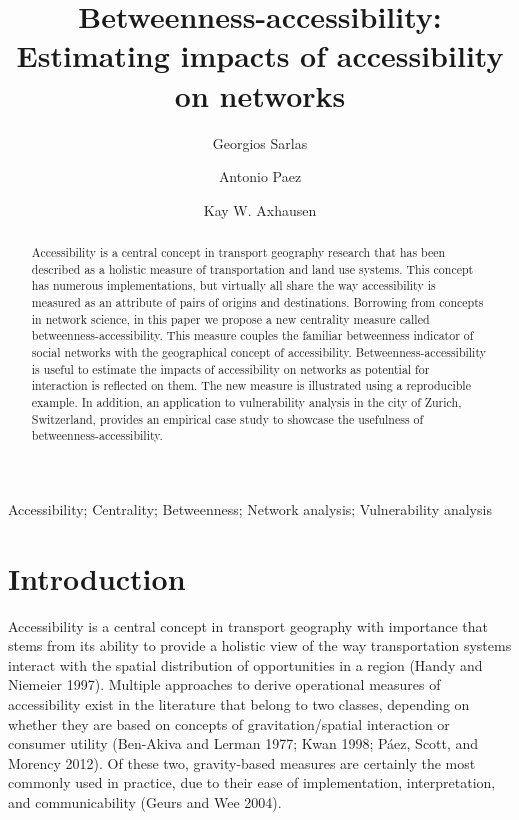 \documentclass[]{elsarticle} %
\begin{document}
\begin{frontmatter}

  \title{Betweenness-accessibility: Estimating impacts of accessibility on
networks}
    \author[ETH]{Georgios Sarlas}
    \author[McMaster University]{Antonio Paez}
  
    \author[ETH]{Kay W. Axhausen}
  
      \address[ETH]{ETH Zurich, Institute for Transport Planning and Systems,
Stefano-Franscini-Platz 5, 8093 Zurich, Switzerland}
    \address[McMaster University]{McMaster University, School of Geography and Earth Sciences, 1280 Main
St W, Hamilton, Ontario, L8S 1S4 Canada}
  
  \begin{abstract}
  Accessibility is a central concept in transport geography research that
  has been described as a holistic measure of transportation and land use
  systems. This concept has numerous implementations, but virtually all
  share the way accessibility is measured as an attribute of pairs of
  origins and destinations. Borrowing from concepts in network science, in
  this paper we propose a new centrality measure called
  betweenness-accessibility. This measure couples the familiar betweenness
  indicator of social networks with the geographical concept of
  accessibility. Betweenness-accessibility is useful to estimate the
  impacts of accessibility on networks as potential for interaction is
  reflected on them. The new measure is illustrated using a reproducible
  example. In addition, an application to vulnerability analysis in the
  city of Zurich, Switzerland, provides an empirical case study to
  showcase the usefulness of betweenness-accessibility.
  \end{abstract}
   \begin{keyword} Accessibility; Centrality; Betweenness; Network analysis; Vulnerability
analysis\end{keyword}
 \end{frontmatter}

\section{Introduction}\label{introduction}

Accessibility is a central concept in transport geography with
importance that stems from its ability to provide a holistic view of the
way transportation systems interact with the spatial distribution of
opportunities in a region (Handy and Niemeier 1997). Multiple approaches
to derive operational measures of accessibility exist in the literature
that belong to two classes, depending on whether they are based on
concepts of gravitation/spatial interaction or consumer utility
(Ben-Akiva and Lerman 1977; Kwan 1998; Páez, Scott, and Morency 2012).
Of these two, gravity-based measures are certainly the most commonly
used in practice, due to their ease of implementation, interpretation,
and communicability (Geurs and Wee 2004).
\end{document}
